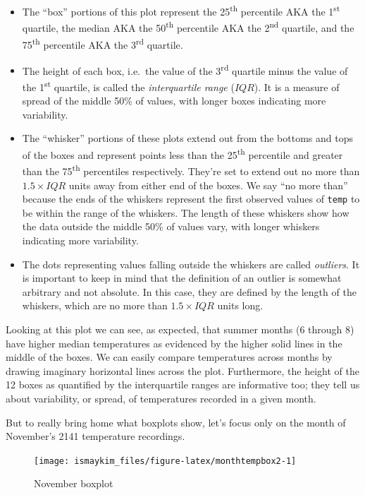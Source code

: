 \documentclass[12pt,]{krantz}
\providecommand{\tightlist}{%
  \setlength{\itemsep}{0pt}\setlength{\parskip}{0pt}}
\begin{document}
\begin{itemize}
\tightlist
\item
  The ``box'' portions of this plot represent the 25\textsuperscript{th}
  percentile AKA the 1\textsuperscript{st} quartile, the median AKA the
  50\textsuperscript{th} percentile AKA the 2\textsuperscript{nd}
  quartile, and the 75\textsuperscript{th} percentile AKA the
  3\textsuperscript{rd} quartile.
\item
  The height of each box, i.e.~the value of the 3\textsuperscript{rd}
  quartile minus the value of the 1\textsuperscript{st} quartile, is
  called the \emph{interquartile range} (\(IQR\)). It is a measure of
  spread of the middle 50\% of values, with longer boxes indicating more
  variability.
\item
  The ``whisker'' portions of these plots extend out from the bottoms
  and tops of the boxes and represent points less than the
  25\textsuperscript{th} percentile and greater than the
  75\textsuperscript{th} percentiles respectively. They're set to extend
  out no more than \(1.5 \times IQR\) units away from either end of the
  boxes. We say ``no more than'' because the ends of the whiskers
  represent the first observed values of \texttt{temp} to be within the
  range of the whiskers. The length of these whiskers show how the data
  outside the middle 50\% of values vary, with longer whiskers
  indicating more variability.
\item
  The dots representing values falling outside the whiskers are called
  \emph{outliers}. It is important to keep in mind that the definition
  of an outlier is somewhat arbitrary and not absolute. In this case,
  they are defined by the length of the whiskers, which are no more than
  \(1.5 \times IQR\) units long.
\end{itemize}

Looking at this plot we can see, as expected, that summer months (6
through 8) have higher median temperatures as evidenced by the higher
solid lines in the middle of the boxes. We can easily compare
temperatures across months by drawing imaginary horizontal lines across
the plot. Furthermore, the height of the 12 boxes as quantified by the
interquartile ranges are informative too; they tell us about
variability, or spread, of temperatures recorded in a given month.

But to really bring home what boxplots show, let's focus only on the
month of November's 2141 temperature recordings.

\begin{figure}

{\centering \texttt{[image: ismaykim\_files/figure-latex/monthtempbox2-1]} 

}

\caption{November boxplot}\label{fig:monthtempbox2}
\end{figure}
\end{document}
